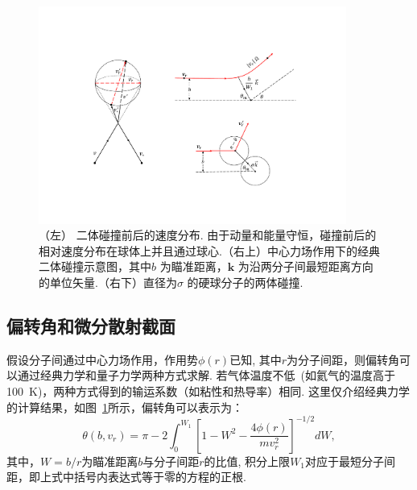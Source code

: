 \begin{figure}[t]
	\centering
	\includegraphics[width=0.9\textwidth]{Fig/Boltzmann_collision_demo.pdf}
	\caption{（左） 二体碰撞前后的速度分布. 由于动量和能量守恒，碰撞前后的相对速度分布在球体上并且通过球心.（右上）中心力场作用下的经典二体碰撞示意图，其中$b$ 为瞄准距离，$\bm{k}$ 为沿两分子间最短距离方向的单位矢量.（右下）直径为$\sigma$ 的硬球分子的两体碰撞.
	}
	\label{Boltzmann_collision_demo}
\end{figure}




\subsection{偏转角和微分散射截面}


假设分子间通过中心力场作用，作用势$\phi(r)$已知, 其中$r$为分子间距，则偏转角可以通过经典力学和量子力学两种方式求解.  若气体温度不低~(如氦气的温度高于100~K)，两种方式得到的输运系数（如粘性和热导率）相同\cite{Sharipov2018Vacuum}. 这里仅介绍经典力学的计算结果，如图~\ref{Boltzmann_collision_demo}所示，偏转角可以表示为：
\begin{equation}\label{deflection}
\theta(b,{v}_r)=\pi-2\int_0^{W_1}\left[1-W^2-\frac{4\phi(r)}{m{v}_r^2}\right]^{-1/2}dW,
\end{equation}
其中，$W=b/r$为瞄准距离$b$与分子间距$r$的比值, 积分上限$W_1$对应于最短分子间距，即上式中括号内表达式等于零的方程的正根. 




